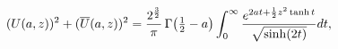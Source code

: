 \[(\mathop{U\/}\nolimits\!\left(a,z\right))^{2}+(\mathop{\overline{U}\/}%
\nolimits\!\left(a,z\right))^{2}=\frac{2^{\frac{3}{2}}}{\pi}\mathop{\Gamma\/}%
\nolimits\!\left(\tfrac{1}{2}-a\right)\int_{0}^{\infty}\frac{e^{2at+\frac{1}{2%
}z^{2}\mathop{\tanh\/}\nolimits t}}{\sqrt{\mathop{\sinh\/}\nolimits(2t)}}dt,\]